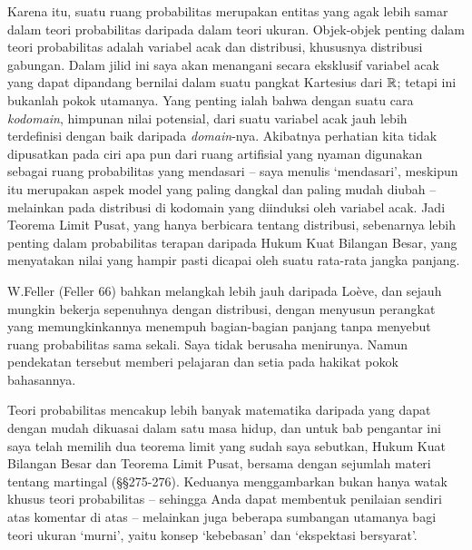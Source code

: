 Karena itu, suatu ruang probabilitas merupakan entitas yang agak lebih samar
dalam teori probabilitas daripada dalam teori ukuran. Objek-objek penting
dalam teori probabilitas adalah variabel acak dan distribusi, khususnya distribusi
gabungan. Dalam jilid ini saya akan menangani secara eksklusif variabel acak yang
dapat dipandang bernilai dalam suatu pangkat Kartesius dari $\Bbb R$; tetapi ini bukanlah
pokok utamanya. Yang penting ialah bahwa dengan suatu cara {\it kodomain},
himpunan nilai potensial, dari suatu variabel acak jauh lebih terdefinisi dengan
baik daripada {\it domain}-nya. Akibatnya perhatian kita tidak dipusatkan pada
ciri apa pun dari ruang artifisial yang nyaman digunakan sebagai ruang
probabilitas yang mendasari -- saya menulis `mendasari', meskipun itu merupakan
aspek model yang paling dangkal dan paling mudah diubah -- melainkan pada
distribusi di kodomain yang diinduksi oleh variabel acak. Jadi Teorema Limit
Pusat, yang hanya berbicara tentang distribusi, sebenarnya lebih penting dalam
probabilitas terapan daripada Hukum Kuat Bilangan Besar, yang menyatakan nilai
yang hampir pasti dicapai oleh suatu rata-rata jangka panjang. 
 
W.Feller ({\smc Feller 66}) bahkan melangkah lebih jauh daripada Lo\`eve, dan
sejauh mungkin bekerja sepenuhnya dengan distribusi, dengan menyusun perangkat
yang memungkinkannya menempuh bagian-bagian panjang tanpa menyebut ruang
probabilitas sama sekali. Saya tidak berusaha menirunya. Namun pendekatan
tersebut memberi pelajaran dan setia pada hakikat pokok bahasannya. 
 
Teori probabilitas mencakup lebih banyak matematika daripada yang dapat dengan
mudah dikuasai dalam satu masa hidup, dan untuk bab pengantar ini saya telah
memilih dua teorema limit yang sudah saya sebutkan, Hukum Kuat Bilangan Besar
dan Teorema Limit Pusat, bersama dengan sejumlah materi tentang martingal
(\S\S275-276). Keduanya menggambarkan bukan hanya watak khusus teori
probabilitas -- sehingga Anda dapat membentuk penilaian sendiri atas komentar
di atas -- melainkan juga beberapa sumbangan utamanya bagi teori ukuran
`murni', yaitu konsep `kebebasan' dan `ekspektasi bersyarat'. 
 
 
\discrpage 
 
